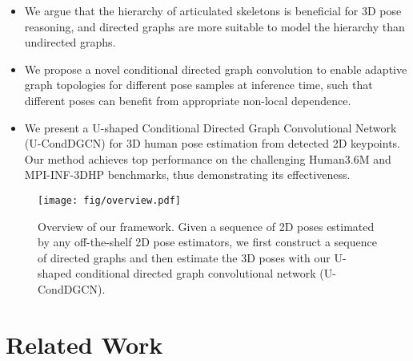 \documentclass[sigconf]{acmart}
\begin{document}
\begin{itemize}
\item We argue that the hierarchy of articulated skeletons is beneficial for 3D pose reasoning, and directed graphs are more suitable to model the hierarchy than undirected graphs. 
	
	\item We propose a novel conditional directed graph convolution to enable adaptive graph topologies for different pose samples at inference time, such that different poses can benefit from appropriate non-local dependence.
	
	\item We present a U-shaped Conditional Directed Graph Convolutional Network (U-CondDGCN) for 3D human pose estimation from detected 2D keypoints. Our method achieves top performance on the challenging Human3.6M and MPI-INF-3DHP benchmarks, thus demonstrating its effectiveness.
\end{itemize}






















 	\begin{figure*}[!t] 
	\centering
	\texttt{[image: fig/overview.pdf]}
	\vspace{-3mm}
	\caption{
		Overview of our framework. Given a sequence of 2D poses estimated by any off-the-shelf 2D pose estimators, we first construct a sequence of directed graphs and then estimate the 3D poses with our U-shaped conditional directed graph convolutional network (U-CondDGCN).
	}
	\vspace{-4mm}
	\label{fig: overview}
\end{figure*} 


\section{Related Work}
\label{sec:relatedWork}
\end{document}
